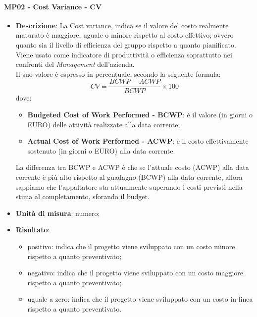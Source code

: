  		\paragraph{MP02 - Cost Variance - CV}
 		\begin{itemize}
 			\item \textbf{Descrizione}:
 			La Cost variance, indica se il valore del costo realmente maturato è maggiore, uguale o minore rispetto al costo effettivo; ovvero quanto sia il livello di efficienza del gruppo rispetto a quanto pianificato. \\
 			Viene usato come indicatore di produttività o efficienza soprattutto nei confronti del {\itshape Management} dell'azienda. \\
 			Il suo valore è espresso in percentuale, secondo la seguente formula:
 			\begin{displaymath}
 				CV = \frac{BCWP - ACWP}{BCWP}\times100
 			\end{displaymath}
 			dove:
 			\begin{itemize}
 				\item {\bfseries Budgeted Cost of Work Performed - BCWP}: è il valore (in giorni o EURO) delle attività realizzate alla data corrente;
 				\item {\bfseries Actual Cost of Work Performed - ACWP}: è il costo effettivamente sostenuto (in giorni o EURO) alla data corrente.
 			\end{itemize}
 			La differenza tra BCWP e ACWP è che se l'attuale costo (ACWP) alla data corrente è più alto rispetto al guadagno (BCWP) alla data corrente, allora sappiamo che l'appaltatore sta attualmente superando i costi previsti nella stima al completamento, sforando il budget.
 			\item \textbf{Unità di misura}: numero;
 			\item \textbf{Risultato}:
 			\begin{itemize}
 				\item positivo: indica che il progetto viene sviluppato con un costo minore rispetto a quanto preventivato;
 				\item negativo:  indica che il progetto viene sviluppato con un costo maggiore rispetto a quanto preventivato;
 				\item uguale a zero: indica che il progetto viene sviluppato con un costo in linea rispetto a quanto preventivato. \\
 			\end{itemize}
 		\end{itemize}

